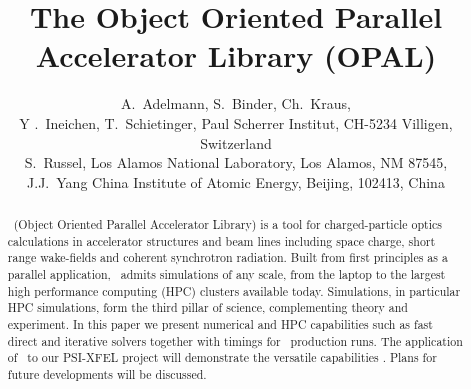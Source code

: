 \documentclass[acus]{JAC2003}
\begin{document}
\title{The Object Oriented Parallel Accelerator Library (\textsc{OPAL})}
\author{A.~Adelmann, S.~Binder, Ch.~Kraus,\\Y .~Ineichen, T.~Schietinger, Paul Scherrer Institut, CH-5234 Villigen, Switzerland\\
S.~Russel, Los Alamos National Laboratory, Los Alamos, NM 87545, \\
J.J.~Yang China Institute of Atomic Energy, Beijing, 102413, China}

\maketitle

\begin{abstract}
 \opal\ (Object Oriented Parallel Accelerator Library) is a tool for charged-particle optics calculations in accelerator structures and beam lines including space charge, short range wake-fields and coherent synchrotron radiation. Built from first principles as a parallel application, \opal\ admits simulations of any scale, from the laptop to the largest high performance computing (HPC) clusters available today. Simulations, in particular HPC simulations, form the third pillar of science, complementing theory and experiment. In this paper we present numerical and HPC capabilities such as fast direct and iterative solvers together with timings for \opal\ production runs. The application of \opal\ to our PSI-XFEL project will demonstrate the versatile capabilities \opal. Plans for future developments will be discussed.\end{abstract}
\end{document}
